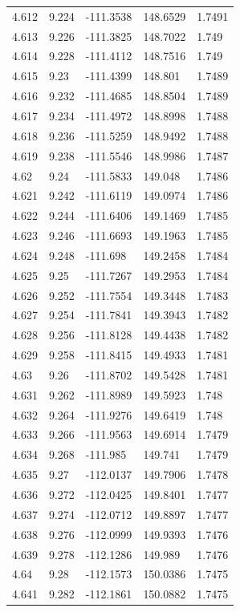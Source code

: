 \begin{tabular}{lllll}
4.612 & 9.224 & -111.3538 & 148.6529 & 1.7491 \\
4.613 & 9.226 & -111.3825 & 148.7022 & 1.749 \\
4.614 & 9.228 & -111.4112 & 148.7516 & 1.749 \\
4.615 & 9.23 & -111.4399 & 148.801 & 1.7489 \\
4.616 & 9.232 & -111.4685 & 148.8504 & 1.7489 \\
4.617 & 9.234 & -111.4972 & 148.8998 & 1.7488 \\
4.618 & 9.236 & -111.5259 & 148.9492 & 1.7488 \\
4.619 & 9.238 & -111.5546 & 148.9986 & 1.7487 \\
4.62 & 9.24 & -111.5833 & 149.048 & 1.7486 \\
4.621 & 9.242 & -111.6119 & 149.0974 & 1.7486 \\
4.622 & 9.244 & -111.6406 & 149.1469 & 1.7485 \\
4.623 & 9.246 & -111.6693 & 149.1963 & 1.7485 \\
4.624 & 9.248 & -111.698 & 149.2458 & 1.7484 \\
4.625 & 9.25 & -111.7267 & 149.2953 & 1.7484 \\
4.626 & 9.252 & -111.7554 & 149.3448 & 1.7483 \\
4.627 & 9.254 & -111.7841 & 149.3943 & 1.7482 \\
4.628 & 9.256 & -111.8128 & 149.4438 & 1.7482 \\
4.629 & 9.258 & -111.8415 & 149.4933 & 1.7481 \\
4.63 & 9.26 & -111.8702 & 149.5428 & 1.7481 \\
4.631 & 9.262 & -111.8989 & 149.5923 & 1.748 \\
4.632 & 9.264 & -111.9276 & 149.6419 & 1.748 \\
4.633 & 9.266 & -111.9563 & 149.6914 & 1.7479 \\
4.634 & 9.268 & -111.985 & 149.741 & 1.7479 \\
4.635 & 9.27 & -112.0137 & 149.7906 & 1.7478 \\
4.636 & 9.272 & -112.0425 & 149.8401 & 1.7477 \\
4.637 & 9.274 & -112.0712 & 149.8897 & 1.7477 \\
4.638 & 9.276 & -112.0999 & 149.9393 & 1.7476 \\
4.639 & 9.278 & -112.1286 & 149.989 & 1.7476 \\
4.64 & 9.28 & -112.1573 & 150.0386 & 1.7475 \\
4.641 & 9.282 & -112.1861 & 150.0882 & 1.7475 \\

\end{tabular}
